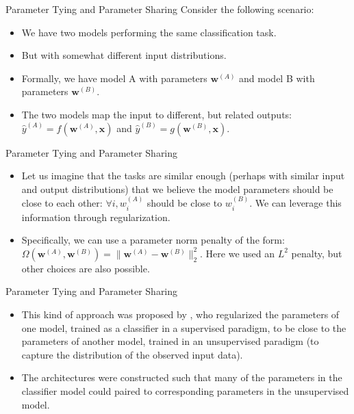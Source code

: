 \documentclass[10pt]{beamer}
\begin{document}
	
	\begin{frame}{Parameter Tying and Parameter Sharing}
		Consider the following scenario:
		\begin{itemize}
			\pause
			\item We have two models performing the same classification task.
			\pause
			\item But with somewhat different input distributions.
			\pause
			\item Formally, we have model A with parameters $\bm{w}^{(A)}$ and model B with parameters $\bm{w}^{(B)}$.
			\pause
			\item The two models map the input to different, but related outputs: $\hat{y}^{(A)}=f(\bm{w}^{(A)},\bm{x})$ and $\hat{y}^{(B)}=g(\bm{w}^{(B)}, \bm{x})$.
		\end{itemize}
	\end{frame}
	
	\begin{frame}{Parameter Tying and Parameter Sharing}
		\begin{itemize}
			\item Let us imagine that the tasks are similar enough (perhaps with similar input and output distributions) that we believe the model parameters should be close to each other: $\forall i,w_i^{(A)}$ should be close to $w_i^{(B)}$. We can leverage this information through regularization.
			\pause
			\item Specifically, we can use a parameter norm penalty of the form: $\Omega(\bm{w}^{(A)}, \bm{w}^{(B)})=\lVert\bm{w}^{(A)}-\bm{w}^{(B)}\rVert^2_2$. Here we used an $L^2$ penalty, but other choices are also possible.
		\end{itemize}
	\end{frame}
	
	\begin{frame}{Parameter Tying and Parameter Sharing}
		\begin{itemize}
			\item This kind of approach was proposed by \citet{lasserre2006principled}, who regularized the parameters of one model, trained as a classifier in a supervised paradigm, to be close to the parameters of another model, trained in an unsupervised paradigm (to capture the distribution of the observed input data).
			\pause
			\item The architectures were constructed such that many of the parameters in the classifier model could paired to corresponding parameters in the unsupervised model.
		\end{itemize}
	\end{frame}
	
\end{document}
